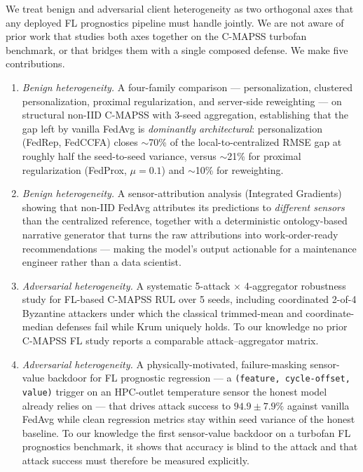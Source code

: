 \documentclass[a4paper,fleqn,doubleblind]{cas-sc}
\begin{document}
We treat benign and adversarial client heterogeneity as two
orthogonal axes that any deployed FL prognostics pipeline must
handle jointly. We are not aware of prior work that studies both
axes together on the C-MAPSS turbofan benchmark, or that bridges
them with a single composed defense. We make five contributions.

\begin{enumerate}
    \item \emph{Benign heterogeneity.} A four-family comparison ---
    personalization, clustered personalization, proximal
    regularization, and server-side reweighting --- on structural
    non-IID C-MAPSS with 3-seed aggregation, establishing that the
    gap left by vanilla FedAvg is \emph{dominantly architectural}:
    personalization (FedRep, FedCCFA) closes $\sim$70\% of the
    local-to-centralized RMSE gap at roughly half the seed-to-seed
    variance, versus $\sim$21\% for proximal regularization
    (FedProx, $\mu = 0.1$) and $\sim$10\% for reweighting.

    \item \emph{Benign heterogeneity.} A sensor-attribution analysis
    (Integrated Gradients) showing that non-IID FedAvg attributes
    its predictions to \emph{different sensors} than the centralized
    reference, together with a deterministic ontology-based narrative
    generator that turns the raw attributions into work-order-ready
    recommendations --- making the model's output actionable for a
    maintenance engineer rather than a data scientist.

    \item \emph{Adversarial heterogeneity.} A systematic
    5-attack $\times$ 4-aggregator robustness study for FL-based
    C-MAPSS RUL over 5 seeds, including coordinated 2-of-4 Byzantine
    attackers under which the classical trimmed-mean and
    coordinate-median defenses fail while Krum uniquely holds. To our
    knowledge no prior C-MAPSS FL study reports a comparable
    attack--aggregator matrix.

    \item \emph{Adversarial heterogeneity.} A physically-motivated,
    failure-masking sensor-value backdoor for FL prognostic
    regression --- a \texttt{(feature, cycle-offset, value)} trigger
    on an HPC-outlet temperature sensor the honest model already
    relies on --- that drives attack success to $94.9 \pm 7.9\%$
    against vanilla FedAvg while clean regression metrics stay within
    seed variance of the honest baseline. To our knowledge the first
    sensor-value backdoor on a turbofan FL prognostics benchmark, it
    shows that accuracy is blind to the attack and that attack
    success must therefore be measured explicitly.


\end{enumerate}
\end{document}
